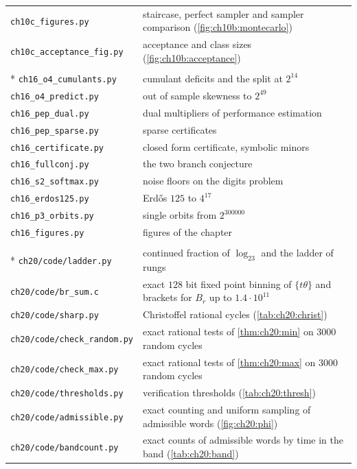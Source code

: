 {\begin{longtable}{@{}l>{\raggedright\arraybackslash}p{}@{}}
\texttt{ch10c\_figures.py} & staircase, perfect sampler and sampler comparison (\cref{fig:ch10b:montecarlo}) \\
\texttt{ch10c\_acceptance\_fig.py} & acceptance and class sizes (\cref{fig:ch10b:acceptance}) \\
\addlinespace[4pt]
\multicolumn{2}{@{}l}{\itshape\Cref{chap:progress}} \\*
\texttt{ch16\_o4\_cumulants.py} & cumulant deficits and the split at $2^{14}$ \\
\texttt{ch16\_o4\_predict.py} & out of sample skewness to $2^{49}$ \\
\texttt{ch16\_pep\_dual.py} & dual multipliers of performance estimation \\
\texttt{ch16\_pep\_sparse.py} & sparse certificates \\
\texttt{ch16\_certificate.py} & closed form certificate, symbolic minors \\
\texttt{ch16\_fullconj.py} & the two branch conjecture \\
\texttt{ch16\_s2\_softmax.py} & noise floors on the digits problem \\
\texttt{ch16\_erdos125.py} & Erd\H{o}s $125$ to $4^{17}$ \\
\texttt{ch16\_p3\_orbits.py} & single orbits from $2^{300000}$ \\
\texttt{ch16\_figures.py} & figures of the chapter \\
\addlinespace[4pt]
\multicolumn{2}{@{}l}{\itshape\Cref{chap:missed}} \\*
\texttt{ch20/code/ladder.py} & continued fraction of $\log_23$ and the ladder of rungs \\
\texttt{ch20/code/br\_sum.c} & exact $128$ bit fixed point binning of $\{t\theta\}$ and brackets for $B_r$ up to $1.4\cdot10^{11}$ \\
\texttt{ch20/code/sharp.py} & Christoffel rational cycles (\cref{tab:ch20:christ}) \\
\texttt{ch20/code/check\_random.py} & exact rational tests of \cref{thm:ch20:min} on $3000$ random cycles \\
\texttt{ch20/code/check\_max.py} & exact rational tests of \cref{thm:ch20:max} on $3000$ random cycles \\
\texttt{ch20/code/thresholds.py} & verification thresholds (\cref{tab:ch20:thresh}) \\
\texttt{ch20/code/admissible.py} & exact counting and uniform sampling of admissible words (\cref{fig:ch20:phi}) \\
\texttt{ch20/code/bandcount.py} & exact counts of admissible words by time in the band (\cref{tab:ch20:band}) \\

\end{longtable}}
